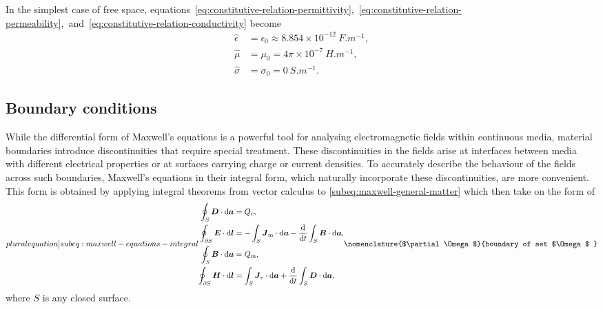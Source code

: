 \documentclass[11pt,a4paper,twoside,openany]{report}
\begin{document}
\begin{example}
    In the simplest case of free space, equations~\eqref{eq:constitutive-relation-permittivity},~\eqref{eq:constitutive-relation-permeability},~and~\eqref{eq:constitutive-relation-conductivity} become
    \begin{subequations}
        \begin{align}
            \hat\epsilon &= \epsilon_0 \approx 8.854\times 10^{-12}\ \unit{F.m^{-1}},
        \\
            \hat\mu &= \mu_0 = 4\pi\times 10^{-7}\ \unit{H.m^{-1}},
        \\
            \hat\sigma &= \sigma_0 = 0\ \unit{S.m^{-1}}.
        \end{align}
    \end{subequations}
\end{example}

\subsection{Boundary conditions}
While the differential form of Maxwell's equations is a powerful tool for analysing electromagnetic fields within continuous media, material boundaries introduce discontinuities that require special treatment. These discontinuities in the fields arise at interfaces between media with different electrical properties or at surfaces carrying charge or current densities. To accurately describe the behaviour of the fields across such boundaries, Maxwell's equations in their integral form, which naturally incorporate these discontinuities, are more convenient. This form is obtained by applying integral theorems from vector calculus to \cref{subeq:maxwell-general-matter} which then take on the form of
\begin{subequations}
    \label[pluralequation]{subeq:maxwell-equations-integral}
    \begin{align}
        \label{eq:maxwell-equations-integral-div-d}
        \oint_S \vec D \cdot \d\vec a &= Q_{\mathrm{e}},
    \\
        \label{eq:maxwell-equations-integral-curl-e}
        \oint_{\partial S} \vec E \cdot \d\vec l &= -\int_S \vec J_{\mathrm m} \cdot \d\vec a - \frac{\d}{\d t}\int_S \vec B \cdot \d\vec a,
    \\
        \label{eq:maxwell-equations-integral-div-b}
        \oint_S \vec B \cdot \d\vec a &= Q_{\mathrm{m}},
    \\
        \label{eq:maxwell-equations-integral-curl-h}
        \oint_{\partial S} \vec H \cdot \d\vec l &= \int_S \vec J_{\mathrm e} \cdot \d\vec a + \frac{\d}{\d t}\int_S \vec D \cdot \d\vec a,
    \end{align}
    \nomenclature{$\partial\Omega$}{boundary of set $\Omega$ }%
\end{subequations}
where $S$ is any closed surface.
\end{document}
